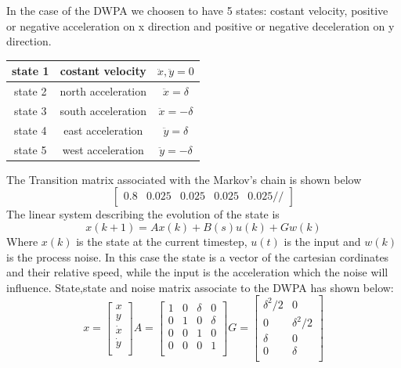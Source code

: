 \documentclass[twocolumn]{article}
\begin{document}
    In the case of the DWPA we choosen to have 5 states: costant velocity, positive or negative acceleration
    on x direction and positive or negative deceleration on y direction.
    \begin{tabular}{||c c c||}%
        \hline
        state 1 & costant velocity      & $\ddot{x},\ddot{y}=0$     \\
        \hline
        state 2  & north acceleration      & $\ddot{x}=\delta$        \\
        \hline
        state 3  & south acceleration    & $\ddot{x}=-\delta$        \\
        \hline
        state 4  & east acceleration    & $\ddot{y}=\delta$     \\
        \hline
        state 5  & west acceleration     & $\ddot{y}=-\delta$       \\ [1ex]
        \hline
    \end{tabular} The Transition matrix 
    associated with the Markov's chain is shown below
    \begin{equation*}
        \begin{bmatrix}
            0.8 & 0.025 & 0.025 & 0.025 & 0.025 //
        \end{bmatrix}
    \end{equation*}
    The linear system describing the evolution of the state is 
    \begin{equation}
        x(k+1)= Ax(k) + B(s)u(k) + Gw(k)
    \end{equation}
    Where $x(k)$ is the state at the current timestep, $u(t)$ is the input and $w(k)$ is the process noise.
    In this case the state is a vector of the cartesian cordinates and their relative speed, while the input 
    is the acceleration which the noise will influence. 
    State,state and noise matrix associate to the DWPA has shown below:
    \[ x=\begin{bmatrix} x \\ y \\ \dot{x} \\ \dot{y} \\ \end{bmatrix}  A=\begin{bmatrix}
            1 & 0 & \delta & 0      \\
            0 & 1 & 0      & \delta \\
            0 & 0 & 1      & 0      \\
            0 & 0 & 0      & 1      \\
        \end{bmatrix}
        G=\begin{bmatrix}
            \delta^2/2 & 0          \\
            0          & \delta^2/2 \\
            \delta     & 0          \\
            0          & \delta     \\
        \end{bmatrix}
    \]
\end{document}
